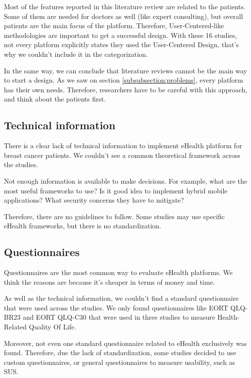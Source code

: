 \documentclass[conference]{IEEEtran}
\begin{document}
Most of the features reported in this literature review are related to the patients. Some of them are needed for doctors as well (like expert consulting), but overall patients are the main focus of the platform. Therefore, User-Centered-like methodologies are important to get a successful design. With these 16 studies, not every platform explicitly states they used the User-Centered Design, that's why we couldn't include it in the categorization.

In the same way, we can conclude that literature reviews cannot be the main way to start a design. As we saw on section \ref{subsubsection:problems}, every platform has their own needs. Therefore, researchers have to be careful with this approach, and think about the patients first.

\subsection{Technical information}

There is a clear lack of technical information to implement eHealth platform for breast cancer patients. We couldn't see a common theoretical framework across the studies.

Not enough information is available to make decisions. For example, what are the most useful frameworks to use? Is it good idea to implement hybrid mobile applications? What security concerns they have to mitigate? 

Therefore, there are no guidelines to follow. Some studies may use specific eHealth frameworks, but there is no standardization.

\subsection{Questionnaires}

Questionnaires are the most common way to evaluate eHealth platforms. We think the reasons are because it's cheaper in terms of money and time.

As well as the technical information, we couldn't find a standard questionnaire that were used across the studies. We only found questionnaires like EORT QLQ-BR23 and EORT QLQ-C30 that were used in three studies to measure Health-Related Quality Of Life.

Moreover, not even one standard questionnaire related to eHealth exclusively was found. Therefore, due the lack of standardization, some studies decided to use custom questionnaires, or general questionnaires to measure usability, such as SUS.
\end{document}
